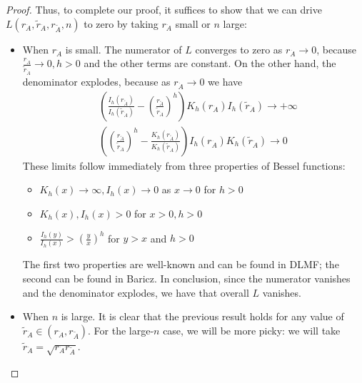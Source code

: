 \documentclass[12pt, nofootinbib,english, amsmath, amssymb, aps, priprint, graphicx,floatfix]{revtex4-1}
\theoremstyle{plain}
\theoremstyle{definition}
\theoremstyle{plain}
\begin{document}
\begin{proof}
Thus, to complete our proof, it suffices to show that we can drive $L(r_{\dot A}, \tilde r_{\dot A}, r_{\tilde A},n)$ to zero by taking $r_{\dot A}$ small or $n$ large:
\begin{itemize}
    \item When $r_{\dot A}$ is small.  The numerator of $L$ converges to zero as $r_{\dot A}\rightarrow 0$, because $\frac{r_{\dot A}}{\tilde r_{\dot A}}\rightarrow 0,h>0$ and the other terms are constant.  On the other hand, the denominator explodes, because as $r_{\dot A}\rightarrow0$ we have
    \begin{align*}
    & \left( \frac{I_h ( r_{\tilde{A}})}{I_h ( \tilde r_{\dot A})} - \left(\frac{r_{\tilde{A}}}{\tilde r_{\dot A}} \right)^h  \right)
                K_h ( r_{\dot A}) I_h ( \tilde r_{\dot A}) \rightarrow +\infty \\
    & \left( \left( \frac{r_{\tilde{A}}}{\tilde r_{\dot A}}\right)^h  - \frac{K_h ( r_{\tilde{A}})}{K_h ( \tilde r_{\dot A})} \right) 
                I_h (r_{\dot A})K_h ( \tilde r_{\dot A})\rightarrow 0
    \end{align*}
    These limits follow immediately from three properties of Bessel functions:
    \begin{itemize}
        \item $K_h(x)\rightarrow \infty,I_h(x)\rightarrow 0$ as $x\rightarrow 0$ for $h>0$
        \item $K_h(x),I_h(x)>0$ for $x>0,h>0$
        \item $\frac{I_{h}(y)}{I_{h}(x)} > \left(\frac{y}{x}\right)^{h}$ for $y>x$ and $h>0$
    \end{itemize} 
    The first two properties are well-known and can be found in DLMF\cite{noauthor_undated-ti}; the second can be found in Baricz.\cite{noauthor_undated-ti,baricz2010bounds}  In conclusion, since the numerator vanishes and the denominator explodes, we have that overall $L$ vanishes.  
    \item When $n$ is large.  It is clear that the previous result holds for any value of $\tilde r_{\dot A}\in (r_{\dot A}, r_{\tilde A})$.  For the large-$n$ case, we will be more picky: we will take $\tilde r_{\dot A}=\sqrt{r_{\dot A} r_{\tilde A}}$.  


\end{itemize}
\end{proof}
\end{document}
